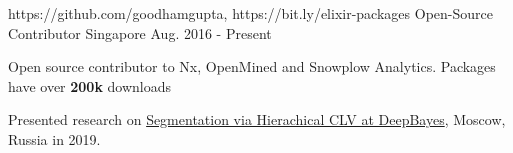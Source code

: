 \begin{cventries}
  \cventry
    {https://github.com/goodhamgupta, https://bit.ly/elixir-packages} %
    {Open-Source Contributor} %
    {Singapore} %
    {Aug. 2016 - Present} %
    {
      \begin{cvitems} %
        \item {Open source contributor to Nx, OpenMined and Snowplow Analytics. Packages have over \textbf{200k} downloads}
        \item {Presented research on \href{https://bit.ly/hierachical-clv}{Segmentation via Hierachical CLV at DeepBayes}, Moscow, Russia in 2019.}
      \end{cvitems}
    }

\end{cventries}
